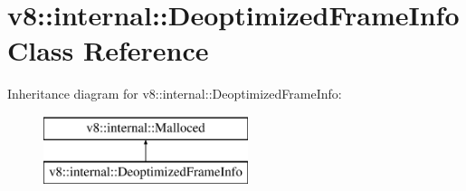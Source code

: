 \hypertarget{classv8_1_1internal_1_1_deoptimized_frame_info}{}\section{v8\+:\+:internal\+:\+:Deoptimized\+Frame\+Info Class Reference}
\label{classv8_1_1internal_1_1_deoptimized_frame_info}
Inheritance diagram for v8\+:\+:internal\+:\+:Deoptimized\+Frame\+Info\+:\begin{figure}[H]
\begin{center}
\leavevmode
\includegraphics[height=2.000000cm]{classv8_1_1internal_1_1_deoptimized_frame_info}
\end{center}
\end{figure}
